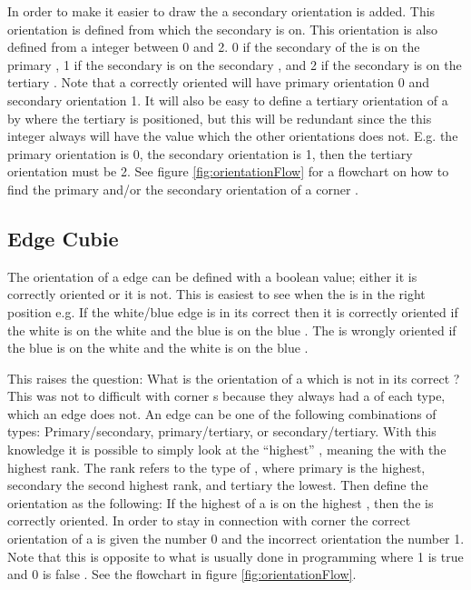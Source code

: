 In order to make it easier to draw the \rubik{} a secondary orientation is added. This orientation is defined from which \face{} the secondary \facelet{} is on.
This orientation is also defined from a integer between 0 and 2.
0 if the secondary \facelet{} of the \cubie{} is on the primary \face{}, 1 if the secondary \facelet{} is on the secondary \face{}, and 2 if the secondary \facelet{} is on the tertiary \face{}.
Note that a correctly oriented \cubie{} will have primary orientation 0 and secondary orientation 1.
It will also be easy to define a tertiary orientation of a \cubie{} by where the tertiary \facelet{} is positioned, but this will be redundant since the this integer always will have the value which the other orientations does not. E.g. the primary orientation is 0, the secondary orientation is 1, then the tertiary orientation must be 2.
See figure \ref{fig:orientationFlow} for a flowchart on how to find the primary and/or the secondary orientation of a corner \cubie{}.

\subsection{Edge Cubie}
The orientation of a edge \cubie{} can be defined with a boolean value; either it is correctly oriented or it is not.
This is easiest to see when the \cubie{} is in the right position e.g.
If the white/blue edge \cubie{} is in its correct \cubicle{} then it is correctly oriented if the white \facelet{} is on the white \face{} and the blue \facelet{} is on the blue \face{}.
The \cubie{} is wrongly oriented if the blue \facelet{} is on the white \face{} and the white \facelet{} is on the blue \face{}.

This raises the question: What is the orientation of a \cubie{} which is not in its correct \cubicle{}?
This was not to difficult with corner \cubie{}s because they always had a \facelet{} of each type, which an edge does not. An edge can be one of the following combinations of \facelet{} types: Primary/secondary, primary/tertiary, or secondary/tertiary. With this knowledge it is possible to simply look at the ``highest'' \facelet{}, meaning the \facelet{} with the highest rank.
The rank refers to the type of \facelet{}, where primary is the highest, secondary the second highest rank, and tertiary the lowest.
Then define the orientation as the following: If the highest \facelet{} of a \cubie{} is on the highest \face{}, then the \cubie{} is correctly oriented.
In order to stay in connection with corner \cubie{} the correct orientation of a \cubie{} is given the number 0 and the incorrect orientation the number 1.
Note that this is opposite to what is usually done in programming where 1 is true and 0 is false \cite{boolean2}.
See the flowchart in figure \ref{fig:orientationFlow}.

